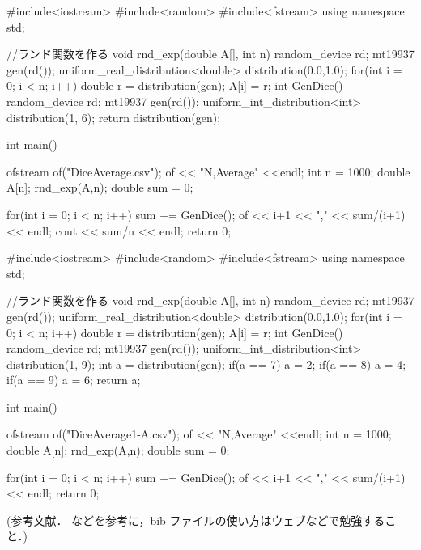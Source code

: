 \documentclass[fleqn, a4paper. 12pt]{ltjsarticle} %
\begin{document}
\begin{cppcode}
  #include<iostream>
#include<random>
#include<fstream>
using namespace std;

//ランド関数を作る
void rnd_exp(double A[], int n){
    random_device rd;
    mt19937 gen(rd());
    uniform_real_distribution<double> distribution(0.0,1.0);
    for(int i = 0; i < n; i++){
        double r = distribution(gen);
        A[i] = r;
    }
}
int GenDice(){
    random_device rd;
    mt19937 gen(rd());
    uniform_int_distribution<int> distribution(1, 6);
    return distribution(gen);
}

int main(){
    ofstream of("DiceAverage.csv");
    of << "N,Average" <<endl; 
    int n = 1000;
    double A[n];
    rnd_exp(A,n);
    double sum = 0;

    for(int i = 0; i < n; i++){
        sum += GenDice();
        of << i+1 << "," << sum/(i+1) << endl;
    }
    cout << sum/n << endl;
    return 0;
}
\end{cppcode}
\begin{cppcode}
  #include<iostream>
#include<random>
#include<fstream>
using namespace std;

//ランド関数を作る
void rnd_exp(double A[], int n){
    random_device rd;
    mt19937 gen(rd());
    uniform_real_distribution<double> distribution(0.0,1.0);
    for(int i = 0; i < n; i++){
        double r = distribution(gen);
        A[i] = r;
    }
}
int GenDice(){
    random_device rd;
    mt19937 gen(rd());
    uniform_int_distribution<int> distribution(1, 9);
    int a = distribution(gen);
    if(a == 7) a = 2;
    if(a == 8) a = 4;
    if(a == 9) a = 6;
    return a;
}

int main(){
    ofstream of("DiceAverage1-A.csv");
    of << "N,Average" <<endl; 
    int n = 1000;
    double A[n];
    rnd_exp(A,n);
    double sum = 0;

    for(int i = 0; i < n; i++){
        sum += GenDice();
        of << i+1 << "," << sum/(i+1) << endl;
    }
    return 0;
}
\end{cppcode}
\newpage

 

(参考文献．\cite{example} などを参考に，bib ファイルの使い方はウェブなどで勉強すること．)
\end{document}
